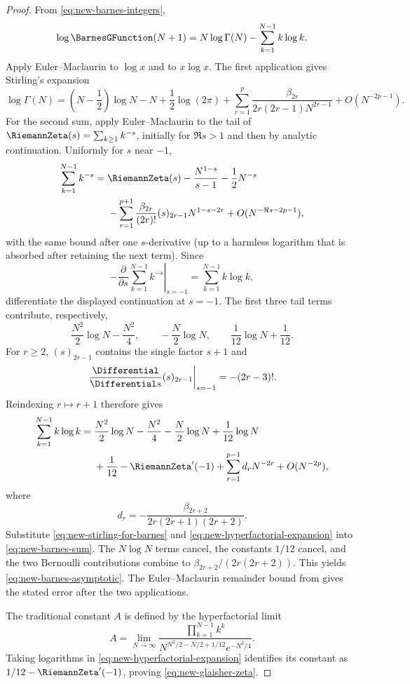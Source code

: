 \documentclass[11pt,a4paper,oneside,openany]{book}
\theoremstyle{definition}
\theoremstyle{remark}
\begin{document}
\begin{proof}
From \eqref{eq:new-barnes-integers},
\begin{equation}\label{eq:new-barnes-sum}
 \log \BarnesGFunction(N+1)=N\log\Gamma(N)-\sum_{k=1}^{N-1}k\log k.
\end{equation}
Apply Euler--Maclaurin to $\log x$ and to $x\log x$.  The first application
gives Stirling's expansion
\begin{equation}\label{eq:new-stirling-for-barnes}
 \log\Gamma(N)=
 \left(N-\frac12\right)\log N-N+\frac12\log(2\pi)
 +\sum_{r=1}^{p}\frac{\beta_{2r}}{2r(2r-1)N^{2r-1}}
 +O(N^{-2p-1}).
\end{equation}
For the second sum, apply Euler--Maclaurin to the tail of
$\RiemannZeta(s)=\sum_{k\ge1}k^{-s}$, initially for $\Re s>1$ and then by analytic
continuation.  Uniformly for $s$ near $-1$,
\begin{align*}
 \sum_{k=1}^{N-1}k^{-s}
 ={}&\RiemannZeta(s)-\frac{N^{1-s}}{s-1}-\frac12N^{-s}\\
 &-\sum_{r=1}^{p+1}
 \frac{\beta_{2r}}{(2r)!}(s)_{2r-1}N^{1-s-2r}
 +O(N^{-\Re s-2p-1}),
\end{align*}
with the same bound after one $s$-derivative (up to a harmless logarithm that
is absorbed after retaining the next term).  Since
\[
 -\left.\frac{\partial}{\partial s}
 \sum_{k=1}^{N-1}k^{-s}\right|_{s=-1}
 =\sum_{k=1}^{N-1}k\log k,
\]
differentiate the displayed continuation at $s=-1$.  The first three tail
terms contribute, respectively,
\[
 \frac{N^2}{2}\log N-\frac{N^2}{4},\qquad
 -\frac N2\log N,\qquad
 \frac1{12}\log N+\frac1{12}.
\]
For $r\ge2$, $(s)_{2r-1}$ contains the single factor $s+1$ and
\[
 \left.\frac{\Differential}{\Differential s}(s)_{2r-1}\right|_{s=-1}
 =-(2r-3)!.
\]
Reindexing $r\mapsto r+1$ therefore gives
\begin{align}
 \sum_{k=1}^{N-1}k\log k
={}&\frac{N^2}{2}\log N-\frac{N^2}{4}
 -\frac N2\log N+\frac1{12}\log N
 \notag\\
 &+\frac1{12}-\RiemannZeta'(-1)
 +\sum_{r=1}^{p-1}d_rN^{-2r}+O(N^{-2p}),
 \label{eq:new-hyperfactorial-expansion}
\end{align}
where
\[
 d_r=-\frac{\beta_{2r+2}}
 {2r(2r+1)(2r+2)}.
\]
Substitute \eqref{eq:new-stirling-for-barnes} and
\eqref{eq:new-hyperfactorial-expansion} into
\eqref{eq:new-barnes-sum}.  The $N\log N$ terms cancel, the constants
$1/12$ cancel, and the two Bernoulli contributions combine to
$\beta_{2r+2}/(2r(2r+2))$.  This yields
\eqref{eq:new-barnes-asymptotic}.  The Euler--Maclaurin remainder bound from
 gives the stated error after the two
applications.

The traditional constant $A$ is defined by the hyperfactorial limit
\[
 A=\lim_{N\to\infty}
 \frac{\prod_{k=1}^{N-1}k^k}
 {N^{N^2/2-N/2+1/12}e^{-N^2/4}}.
\]
Taking logarithms in \eqref{eq:new-hyperfactorial-expansion} identifies its
constant as $1/12-\RiemannZeta'(-1)$, proving
\eqref{eq:new-glaisher-zeta}.
\end{proof}
\end{document}

